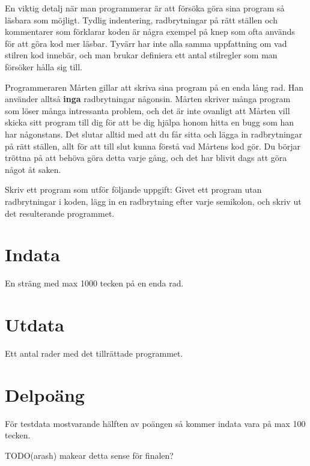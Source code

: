 En viktig detalj när man programmerar är att försöka göra sina
program så läsbara som möjligt. Tydlig indentering, radbrytningar på
rätt ställen och kommentarer som förklarar koden är några exempel
på knep som ofta används för att göra kod mer läsbar. Tyvärr har
inte alla samma uppfattning om vad stilren kod innebär, och man brukar
definiera ett antal stilregler som man försöker hålla sig till.

Programmeraren Mårten gillar att skriva sina program på en enda lång
rad. Han använder alltså \textbf{inga} radbrytningar någonsin.
Mårten skriver många program som löser många intressanta problem,
och det är inte ovanligt att Mårten vill skicka sitt program till dig
för att be dig hjälpa honom hitta en bugg som han har någonstans.
Det slutar alltid med att du får sitta och lägga in radbrytningar på
rätt ställen, allt för att till slut kunna förstå vad Mårtens kod
gör. Du börjar tröttna på att behöva göra detta varje gång, och
det har blivit dags att göra något åt saken.

Skriv ett program som utför följande uppgift: Givet ett program utan
radbrytningar i koden, lägg in en radbrytning efter varje semikolon,
och skriv ut det resulterande programmet.

\section*{Indata}

En sträng med max 1000 tecken på en enda rad.

\section*{Utdata}

Ett antal rader med det tillrättade programmet.

\section*{Delpoäng}

För testdata mostvarande hälften av poängen så kommer indata vara på max 100 tecken. 

TODO(arash) makear detta sense för finalen?
